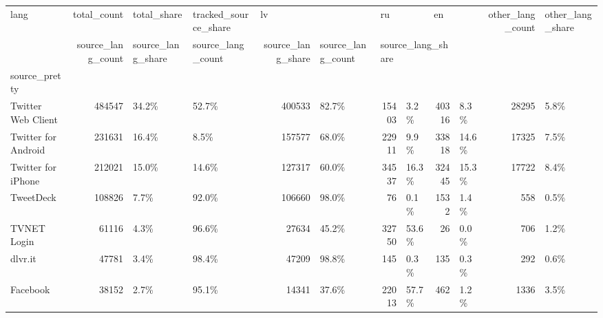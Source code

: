 \begin{tabular}{lrllrlrlrlrl}
\toprule
lang & total\_count & total\_share & tracked\_source\_share & \multicolumn{2}{l}{lv} & \multicolumn{2}{l}{ru} & \multicolumn{2}{l}{en} & other\_lang\_count & other\_lang\_share \\
{} & source\_lang\_count & source\_lang\_share & source\_lang\_count & source\_lang\_share & source\_lang\_count & \multicolumn{3}{l}{source\_lang\_share} \\
source\_pretty       &             &             &                      &                   &                   &                   &                   &                   &                   &                  &                  \\
\midrule
Twitter Web Client  &      484547 &       34.2\% &                52.7\% &            400533 &             82.7\% &             15403 &              3.2\% &             40316 &              8.3\% &            28295 &             5.8\% \\
Twitter for Android &      231631 &       16.4\% &                 8.5\% &            157577 &             68.0\% &             22911 &              9.9\% &             33818 &             14.6\% &            17325 &             7.5\% \\
Twitter for iPhone  &      212021 &       15.0\% &                14.6\% &            127317 &             60.0\% &             34537 &             16.3\% &             32445 &             15.3\% &            17722 &             8.4\% \\
TweetDeck           &      108826 &        7.7\% &                92.0\% &            106660 &             98.0\% &                76 &              0.1\% &              1532 &              1.4\% &              558 &             0.5\% \\
TVNET Login         &       61116 &        4.3\% &                96.6\% &             27634 &             45.2\% &             32750 &             53.6\% &                26 &              0.0\% &              706 &             1.2\% \\
dlvr.it             &       47781 &        3.4\% &                98.4\% &             47209 &             98.8\% &               145 &              0.3\% &               135 &              0.3\% &              292 &             0.6\% \\
Facebook            &       38152 &        2.7\% &                95.1\% &             14341 &             37.6\% &             22013 &             57.7\% &               462 &              1.2\% &             1336 &             3.5\% \\

\end{tabular}
